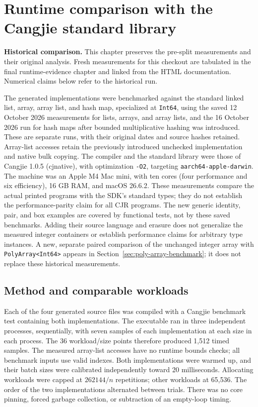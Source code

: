 \section{Runtime comparison with the Cangjie standard library}
\noindent\textbf{Historical comparison.} This chapter preserves the pre-split
measurements and their original analysis. Fresh measurements for this checkout
are tabulated in the final runtime-evidence chapter and linked from the HTML
documentation. Numerical claims below refer to the historical run.\par

\label{sec:benchmarks}

The generated implementations were benchmarked against the standard
linked list, array, array list, and hash map, specialized at \texttt{Int64},
using the saved 12 October 2026 measurements for lists, arrays, and
array lists, and the 16 October 2026 run for hash maps after bounded
multiplicative hashing was introduced. These are separate runs, with their
original dates and source hashes retained. Array-list accesses retain the
previously introduced unchecked implementation and native bulk copying.
The compiler and the standard library were those of Cangjie 1.0.5 (cjnative),
with optimization \texttt{-O2}, targeting \texttt{aarch64-apple-darwin}.
The machine was an Apple M4 Mac mini, with ten cores (four performance and
six efficiency), 16 GB RAM, and macOS 26.6.2.  These measurements compare
the actual printed programs with the SDK's standard types; they do not
establish the performance-parity claim for all CJR programs.
The new generic identity, pair, and box examples are covered by functional
tests, not by these saved benchmarks. Adding their source language and
erasure does not generalize the measured integer containers or establish
performance claims for arbitrary type instances. A new, separate paired
comparison of the unchanged integer array with \texttt{PolyArray<Int64>}
appears in Section~\ref{sec:poly-array-benchmark}; it does not replace
these historical measurements.

\subsection{Method and comparable workloads}

Each of the four generated source files was compiled with a
Cangjie benchmark test containing both implementations.  The executable
ran in three independent processes, sequentially, with seven samples of
each implementation at each size in each process.  The 36 workload/size
points therefore produced 1,512 timed samples. The measured array-list accesses have no runtime bounds checks; all benchmark inputs use valid indexes.  Both implementations were
warmed up, and their batch sizes were calibrated independently toward
20 milliseconds.  Allocating workloads were capped at $262144/n$
repetitions; other workloads at 65,536.  The order of the two implementations alternated between
trials.  There was no core pinning, forced garbage collection, or subtraction
of an empty-loop timing.

